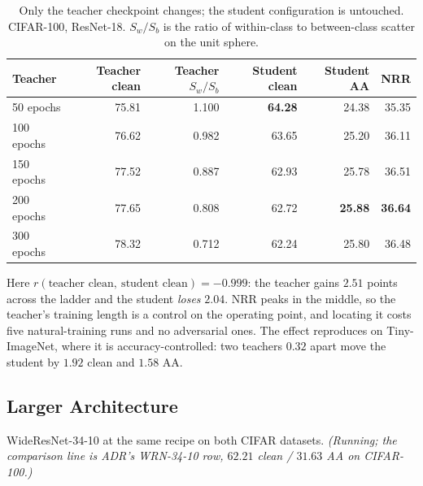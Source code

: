 \begin{table}[t]
  \centering
  \caption{Only the teacher checkpoint changes; the student configuration is untouched. CIFAR-100,
  ResNet-18. $S_w/S_b$ is the ratio of within-class to between-class scatter on the unit sphere.}
  \label{tab:teacherladder}
  \begin{tabular}{lrrrrr}
    \toprule
    Teacher & Teacher clean & Teacher $S_w/S_b$ & Student clean & Student AA & NRR \\
    \midrule
    50 epochs  & 75.81 & 1.100 & \textbf{64.28} & 24.38 & 35.35 \\
    100 epochs & 76.62 & 0.982 & 63.65 & 25.20 & 36.11 \\
    150 epochs & 77.52 & 0.887 & 62.93 & 25.78 & 36.51 \\
    200 epochs & 77.65 & 0.808 & 62.72 & \textbf{25.88} & \textbf{36.64} \\
    300 epochs & 78.32 & 0.712 & 62.24 & 25.80 & 36.48 \\
    \bottomrule
  \end{tabular}
\end{table}

Here $r(\text{teacher clean},\ \text{student clean}) = -0.999$: the teacher gains $2.51$ points across
the ladder and the student \emph{loses} $2.04$. NRR peaks in the middle, so the teacher's training
length is a control on the operating point, and locating it costs five natural-training runs and no
adversarial ones. The effect reproduces on Tiny-ImageNet, where it is accuracy-controlled: two
teachers $0.32$ apart move the student by $1.92$ clean and $1.58$ AA.

\subsection{Larger Architecture}
\label{sec:wrn}

WideResNet-34-10 at the same recipe on both CIFAR datasets. \emph{(Running; the comparison line is
ADR's WRN-34-10 row, $62.21$ clean / $31.63$ AA on CIFAR-100.)}
